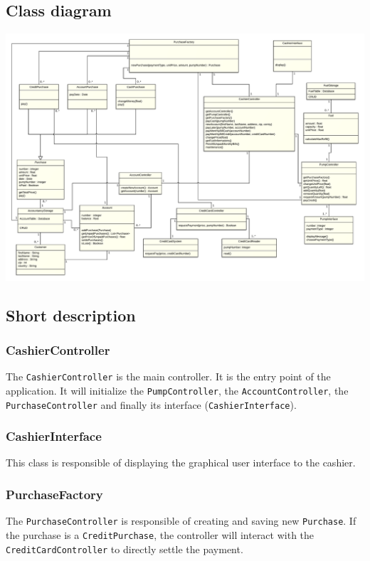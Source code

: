 \documentclass[11pt, a4paper]{article}
\newcommand{\settextlisting}{\lstset{ basicstyle=\small\ttfamily }}
\begin{document}
\subsection*{Class diagram}

\begin{center}
\centerline{\includegraphics[angle=90, origin=c, width=1\textwidth]{uml.png}}
\end{center}

\subsection*{Short description}

\settextlisting

\subsubsection*{CashierController}
The \lstinline|CashierController| is the main controller. It is the entry point of the application. It will initialize the \lstinline|PumpController|, the \lstinline|AccountController|, the \lstinline|PurchaseController| and finally its interface (\lstinline|CashierInterface|).

\subsubsection*{CashierInterface}
This class is responsible of displaying the graphical user interface to the cashier.

\subsubsection*{PurchaseFactory}
The \lstinline|PurchaseController| is responsible of creating and saving new \lstinline|Purchase|.
If the purchase is a \lstinline|CreditPurchase|, the controller will interact with the \lstinline|CreditCardController| to directly settle the payment.
\end{document}
